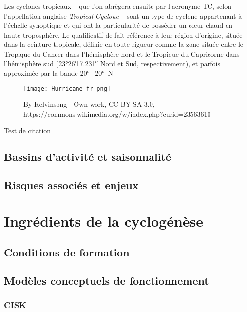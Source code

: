 \documentclass[../main.tex]{subfiles}
\begin{document}
Les cyclones tropicaux -- que l'on abrègera ensuite par l'acronyme TC, selon l'appellation anglaise \textit{Tropical Cyclone} -- sont un type de cyclone appartenant à l'échelle synoptique et qui ont la particularité de posséder un cœur chaud en haute troposphère. Le qualificatif de  fait référence à leur région d'origine, située dans la ceinture tropicale, définie en toute rigueur comme la zone située entre le Tropique du Cancer dans l'hémisphère nord et le Tropique du Capricorne dans
l'hémisphère sud (\ang{23;26;17.231} Nord et Sud, respectivement), et parfois approximée par la bande \ang{+20}~\ang{-20}~N. 

\begin{figure}[htpb]
    \centering
    \texttt{[image: Hurricane-fr.png]}
    \caption{By Kelvinsong - Own work, CC BY-SA 3.0, \url{https://commons.wikimedia.org/w/index.php?curid=23563610}}
    \label{fig:}
\end{figure}

Test de citation \cite{chauvin_response_2006}

\subsection{Bassins d'activité et saisonnalité}

\subsection{Risques associés et enjeux}

\section{Ingrédients de la cyclogénèse}
  
\subsection{Conditions de formation}

\subsection{Modèles conceptuels de fonctionnement}

\subsubsection{CISK}
\end{document}
